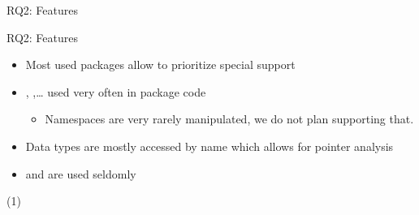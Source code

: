 \begin{frame}[c]{RQ2: Features}
   \centering
   \hfill{}%
   \hfill{}%
\end{frame}

\def\I#1{\quad\textcolor{gray}{\footnotesize#1}}
\begin{frame}[c]{RQ2: Features}
   \centering
   \begin{itemize}
      \itemsep12pt
      \item<2-> Most used packages allow to prioritize special support
      \item<3-> , ,\ldots{} used very often in package code
      \begin{itemize}
         \item<4-> Namespaces are very rarely manipulated, we do not plan supporting that.
      \end{itemize}
      \item<5-> Data types are mostly accessed by name which allows for pointer analysis
      \item<6->  and  are used seldomly
   \end{itemize}
   (1)%
\end{frame}


